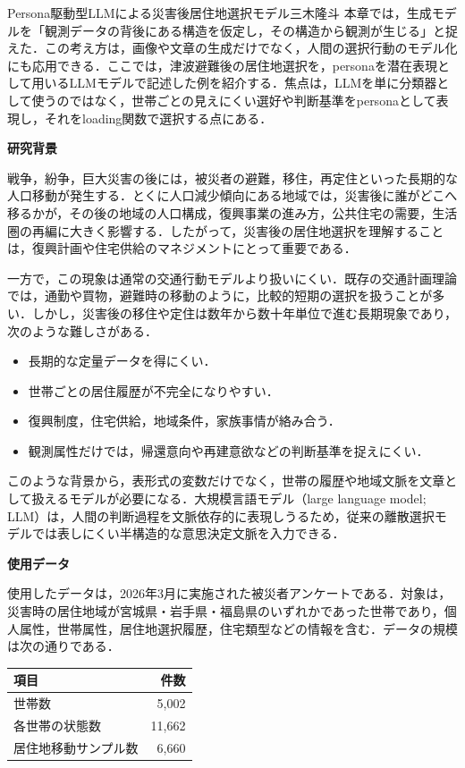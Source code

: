 \clearpage
\begin{column}{Persona駆動型LLMによる災害後居住地選択モデル}{三木隆斗}
本章では，生成モデルを「観測データの背後にある構造を仮定し，その構造から観測が生じる」と捉えた．この考え方は，画像や文章の生成だけでなく，人間の選択行動のモデル化にも応用できる．ここでは，津波避難後の居住地選択を，personaを潜在表現として用いるLLMモデルで記述した例を紹介する．焦点は，LLMを単に分類器として使うのではなく，世帯ごとの見えにくい選好や判断基準をpersonaとして表現し，それをloading関数で選択する点にある．

\medskip
\noindent
\textbf{研究背景}

戦争，紛争，巨大災害の後には，被災者の避難，移住，再定住といった長期的な人口移動が発生する．とくに人口減少傾向にある地域では，災害後に誰がどこへ移るかが，その後の地域の人口構成，復興事業の進み方，公共住宅の需要，生活圏の再編に大きく影響する．したがって，災害後の居住地選択を理解することは，復興計画や住宅供給のマネジメントにとって重要である．

一方で，この現象は通常の交通行動モデルより扱いにくい．既存の交通計画理論では，通勤や買物，避難時の移動のように，比較的短期の選択を扱うことが多い．しかし，災害後の移住や定住は数年から数十年単位で進む長期現象であり，次のような難しさがある．

\begin{itemize}
\item 長期的な定量データを得にくい．
\item 世帯ごとの居住履歴が不完全になりやすい．
\item 復興制度，住宅供給，地域条件，家族事情が絡み合う．
\item 観測属性だけでは，帰還意向や再建意欲などの判断基準を捉えにくい．
\end{itemize}

このような背景から，表形式の変数だけでなく，世帯の履歴や地域文脈を文章として扱えるモデルが必要になる．大規模言語モデル（large language model; LLM）は，人間の判断過程を文脈依存的に表現しうるため，従来の離散選択モデルでは表しにくい半構造的な意思決定文脈を入力できる．

\medskip
\noindent
\textbf{使用データ}

使用したデータは，2026年3月に実施された被災者アンケートである．対象は，災害時の居住地域が宮城県・岩手県・福島県のいずれかであった世帯であり，個人属性，世帯属性，居住地選択履歴，住宅類型などの情報を含む．データの規模は次の通りである．

\begin{center}
\scriptsize
\begin{tabular}{lr}
\toprule
項目 & 件数 \\
\midrule
世帯数 & 5,002 \\
各世帯の状態数 & 11,662 \\
居住地移動サンプル数 & 6,660 \\
\bottomrule
\end{tabular}
\end{center}


\end{column}
